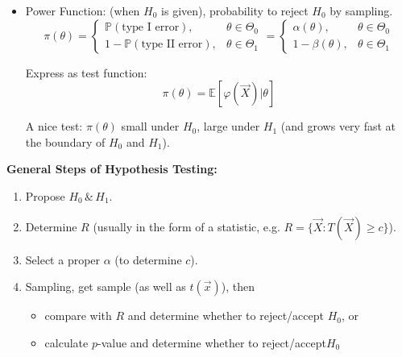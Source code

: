 \begin{itemize}[topsep = -3 pt]
        \item Power Function: (when $H_0$ is given), probability to reject $H_0$ by sampling.
        \begin{equation}
            \pi(\theta)=\begin{cases}
                \mathbb{P}(\text{type I error}),& \theta\in\Theta_0\\
                1-\mathbb{P}(\text{type II error}),& \theta\in\Theta_1
            \end{cases}
            =
            \begin{cases}
                \alpha(\theta),&\theta\in\Theta_0\\
                1-\beta(\theta),&\theta\in\Theta_1
            \end{cases}
        \end{equation}

        Express as test function:
        \begin{equation}
            \pi(\theta)=\mathbb{E}[\varphi(\vec{X})|\theta]
        \end{equation}

        A nice test: $\pi(\theta)$ small under $H_0$, large under $H_1$ (and grows very fast at the boundary of $ H_0 $ and $ H_1 $).
        \end{itemize}

        \begin{point}
            \textbf{General Steps of Hypothesis Testing:}
        \end{point}
        
        

        \begin{enumerate}[topsep=0pt]
            \item Propose $H_0\,\&\, H_1$.
            \item Determine $R$ (usually in the form of a statistic, e.g. $R=\{\vec{X}:T(\vec{X})\geq c\}$).
            \item Select a proper $\alpha$ (to determine $c$).
            \item Sampling, get sample (as well as $t(\vec{x})$), then 
            \begin{itemize}[topsep=-1pt,itemsep=-2pt]
                \item compare with $R$ and determine whether to reject/accept $H_0$, or
                \item calculate $ p $-value and determine whether to reject/accept$ H_0 $
            \end{itemize}
            
                
            

        \end{enumerate}

